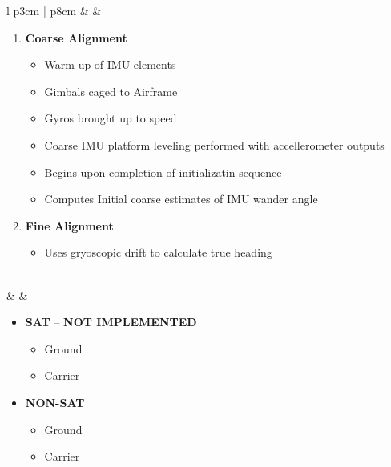 \documentclass[fontHelvetica]{TechCheck}
\begin{document}
	\begin{center}
		\begin{longtable}{l p{3cm} | p{8cm}}
			\toprule
			\textbf{\textbullet} &  &
			\begin{minipage}[t]{\linewidth}
				\vspace{-7pt}
				\begin{enumerate}
					\item \textbf{Coarse Alignment}
					\begin{itemize}
						\item Warm-up of IMU elements
						\item Gimbals caged to Airframe
						\item Gyros brought up to speed
						\item Coarse IMU platform leveling performed with accellerometer outputs
						\item Begins upon completion of initializatin sequence
						\item Computes Initial coarse estimates of IMU wander angle
					\end{itemize}
					\item \textbf{Fine Alignment}
					\begin{itemize}
						\item Uses gryoscopic drift to calculate true heading
					\end{itemize}
				\end{enumerate}
			\end{minipage} \\
			\midrule
			\textbf{\textbullet} &  &
			\begin{minipage}[t]{\linewidth}
				\vspace{-7pt}
				\begin{itemize}
					\item \textbf{SAT} -- \textbf{NOT IMPLEMENTED}
					\begin{itemize}
						\item Ground
						\item Carrier
					\end{itemize}
					\item \textbf{NON-SAT}
					\begin{itemize}
						\item Ground
						\item Carrier
					\end{itemize}
				\end{itemize}
			\end{minipage} \\

\end{longtable}
\end{center}
\end{document}
